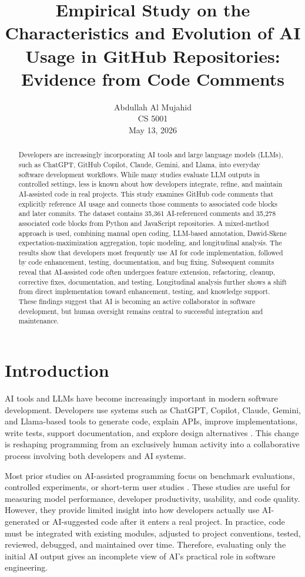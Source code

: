 \documentclass[12pt,draftclsnofoot,onecolumn]{IEEEtran}
\title{Empirical Study on the Characteristics and Evolution of AI Usage in GitHub Repositories:\\[-0.35em]
Evidence from Code Comments}
\author{Abdullah Al Mujahid\\\normalsize CS 5001\\May 13, 2026}
\begin{document}
\maketitle
\vspace{-1.25em}

\begin{abstract}
Developers are increasingly incorporating AI tools and large language models (LLMs), such as ChatGPT, GitHub Copilot, Claude, Gemini, and Llama, into everyday software development workflows. While many studies evaluate LLM outputs in controlled settings, less is known about how developers integrate, refine, and maintain AI-assisted code in real projects. This study examines GitHub code comments that explicitly reference AI usage and connects those comments to associated code blocks and later commits. The dataset contains 35,361 AI-referenced comments and 35,278 associated code blocks from Python and JavaScript repositories. A mixed-method approach is used, combining manual open coding, LLM-based annotation, Dawid-Skene expectation-maximization aggregation, topic modeling, and longitudinal analysis. The results show that developers most frequently use AI for code implementation, followed by code enhancement, testing, documentation, and bug fixing. Subsequent commits reveal that AI-assisted code often undergoes feature extension, refactoring, cleanup, corrective fixes, documentation, and testing. Longitudinal analysis further shows a shift from direct implementation toward enhancement, testing, and knowledge support. These findings suggest that AI is becoming an active collaborator in software development, but human oversight remains central to successful integration and maintenance.
\end{abstract}

\section{Introduction}

AI tools and LLMs have become increasingly important in modern software development. Developers use systems such as ChatGPT, Copilot, Claude, Gemini, and Llama-based tools to generate code, explain APIs, improve implementations, write tests, support documentation, and explore design alternatives \cite{barke2023grounded,murali2024ai}. This change is reshaping programming from an exclusively human activity into a collaborative process involving both developers and AI systems.

Most prior studies on AI-assisted programming focus on benchmark evaluations, controlled experiments, or short-term user studies \cite{peng2023impact,du2024evaluating}. These studies are useful for measuring model performance, developer productivity, usability, and code quality. However, they provide limited insight into how developers actually use AI-generated or AI-suggested code after it enters a real project. In practice, code must be integrated with existing modules, adjusted to project conventions, tested, reviewed, debugged, and maintained over time. Therefore, evaluating only the initial AI output gives an incomplete view of AI's practical role in software engineering.
\end{document}
